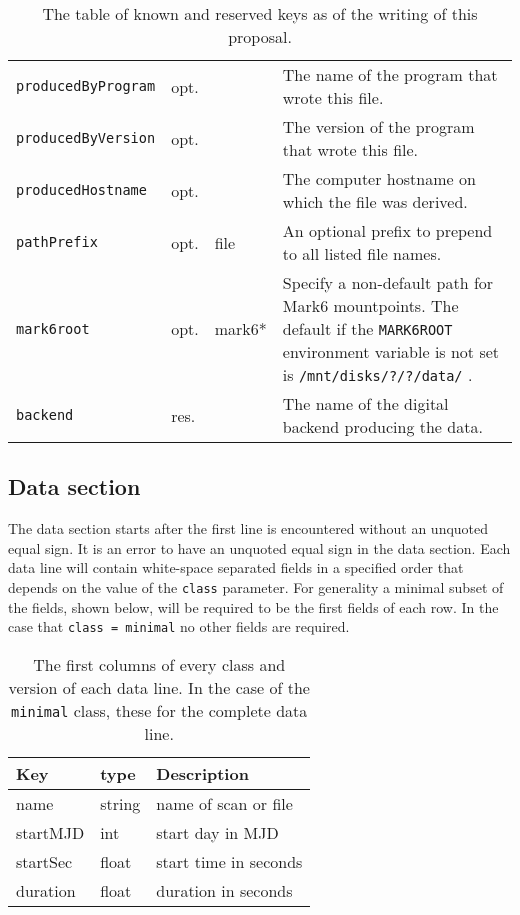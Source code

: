\documentclass[12pt]{article}
\begin{document}
\begin{table}[h]
\begin{tabularx}{\textwidth}{lllX}
{\tt producedByProgram} & opt.  &        & The name of the program that wrote this file. \\
{\tt producedByVersion} & opt.  &        & The version of the program that wrote this file. \\
{\tt producedHostname}  & opt.  &        & The computer hostname on which the file was derived. \\
{\tt pathPrefix}        & opt.  & file   & An optional prefix to prepend to all listed file names. \\
{\tt mark6root}         & opt.  & mark6* & Specify a non-default path for Mark6 mountpoints.  The default if the {\tt MARK6ROOT} environment variable is not set is {\tt /mnt/disks/?/?/data/} . \\
{\tt backend}           & res.  &        & The name of the digital backend producing the data. \\
\hline
\hline
\end{tabularx}
\caption{\label{tab:keys}
The table of known and reserved keys as of the writing of this proposal.
}
\end{table}


\subsection{Data section} \label{sec:data}

The data section starts after the first line is encountered without an unquoted equal sign.
It is an error to have an unquoted equal sign in the data section.
Each data line will contain white-space separated fields in a specified order that depends on the value of the {\tt class} parameter.
For generality a minimal subset of the fields, shown below, will be required to be the first fields of each row.
In the case that {\tt class = minimal} no other fields are required.

\begin{table}[h]
\begin{tabularx}{\textwidth}{llX}
\hline
Key & type & Description \\
\hline
name & string & name of scan or file \\
startMJD & int & start day in MJD \\
startSec & float & start time in seconds \\
duration & float & duration in seconds \\
\hline
\hline
\end{tabularx}
\caption{\label{tab:minimaldata}
The first columns of every class and version of each data line.  In the case of the {\tt minimal} class, these for the complete data line.
}
\end{table}
\end{document}
